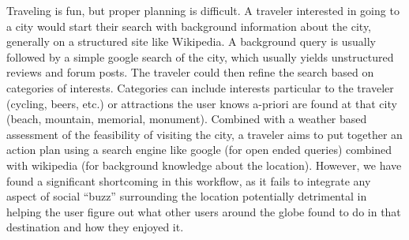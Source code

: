 Traveling is fun, but proper planning is difficult. A traveler interested in going to a city would start their search with background information about the city, generally on a structured site like Wikipedia. A background query is usually followed by a simple google search of the city, which usually yields unstructured reviews and forum posts. The traveler could then refine the search based on categories of interests. Categories can include interests particular to the traveler (cycling, beers, etc.) or attractions the user knows a-priori are found at that city (beach, mountain, memorial, monument). Combined with a weather based assessment of the feasibility of visiting the city, a traveler aims to put together an action plan using a search engine like google (for open ended queries) combined with wikipedia (for background knowledge about the location). However, we have found a significant shortcoming in this workflow, as it fails to integrate any aspect of social ``buzz'' surrounding the location potentially detrimental in helping the user figure out what other users around the globe found to do in that destination and how they enjoyed it.
